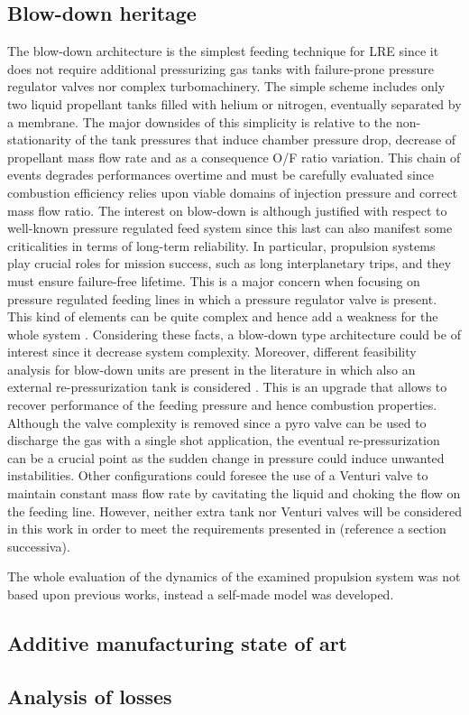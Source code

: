 \subsection{Blow-down heritage}
\label{subsec:blowdown_intro}
The blow-down architecture is the simplest feeding technique for LRE since it does not require additional pressurizing gas tanks with failure-prone pressure regulator valves nor complex turbomachinery. The simple scheme includes only two liquid propellant tanks filled with helium or nitrogen, eventually separated by a membrane. The major downsides of this simplicity is relative to the non-stationarity of the tank pressures that induce chamber pressure drop, decrease of propellant mass flow rate  and as a consequence O/F ratio variation. This chain of events degrades performances overtime and must be carefully evaluated since combustion efficiency relies upon viable domains of injection pressure and correct mass flow ratio. The interest on blow-down is although justified with respect to well-known pressure regulated feed system since this last can also manifest some criticalities in terms of long-term reliability. In particular, propulsion systems play crucial roles for mission success, such as long interplanetary trips, and they must ensure failure-free lifetime. This is a major concern when focusing on pressure regulated feeding lines in which a pressure regulator valve is present. This kind of elements can be quite complex and hence add a weakness for the whole system \cite{valve_criticalities}. Considering these facts, a blow-down type architecture could be of interest since it decrease system complexity. Moreover, different feasibility analysis for blow-down units are present in the literature in which also an external re-pressurization tank is considered \cite{repressurization}. This is an upgrade that allows to recover performance of the feeding pressure and hence combustion properties. Although the valve complexity is removed since a pyro valve can be used to discharge the gas with a single shot application, the eventual re-pressurization can be a crucial point as the sudden change in pressure could induce unwanted instabilities. Other configurations could foresee the use of a Venturi valve to maintain constant mass flow rate by cavitating the liquid and choking the flow on the feeding line. However, neither extra tank nor Venturi valves will be considered in this work in order to meet the requirements presented in (reference a section successiva).

The whole evaluation of the dynamics of the examined propulsion system was not based upon previous works, instead a self-made model was developed.
\subsection{Additive manufacturing state of art}
\label{subsec:additive_intro}

\subsection{Analysis of losses}
\label{subsec:losses_intro}